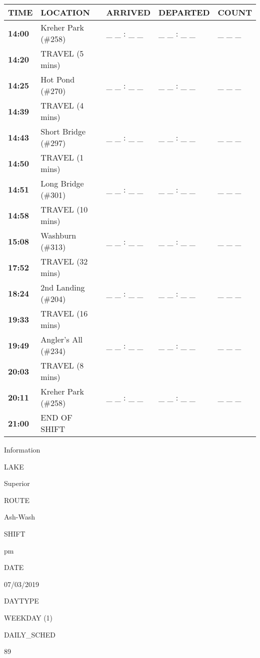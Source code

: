 \documentclass[]{article}
\begin{document}
\begin{tabular}{>{\bfseries}lllll}
\toprule
\textbf{TIME} & \textbf{LOCATION} & \textbf{ARRIVED} & \textbf{DEPARTED} & \textbf{COUNT}\\
\midrule
14:00 & Kreher Park (\#258) & \_ \_ : \_ \_ & \_ \_ : \_ \_ & \_ \_ \_\\
14:20 & TRAVEL (5 mins) &  &  & \\
14:25 & Hot Pond (\#270) & \_ \_ : \_ \_ & \_ \_ : \_ \_ & \_ \_ \_\\
14:39 & TRAVEL (4 mins) &  &  & \\
14:43 & Short Bridge (\#297) & \_ \_ : \_ \_ & \_ \_ : \_ \_ & \_ \_ \_\\
14:50 & TRAVEL (1 mins) &  &  & \\
14:51 & Long Bridge (\#301) & \_ \_ : \_ \_ & \_ \_ : \_ \_ & \_ \_ \_\\
14:58 & TRAVEL (10 mins) &  &  & \\
15:08 & Washburn (\#313) & \_ \_ : \_ \_ & \_ \_ : \_ \_ & \_ \_ \_\\
17:52 & TRAVEL (32 mins) &  &  & \\
18:24 & 2nd Landing (\#204) & \_ \_ : \_ \_ & \_ \_ : \_ \_ & \_ \_ \_\\
19:33 & TRAVEL (16 mins) &  &  & \\
19:49 & Angler's All (\#234) & \_ \_ : \_ \_ & \_ \_ : \_ \_ & \_ \_ \_\\
20:03 & TRAVEL (8 mins) &  &  & \\
20:11 & Kreher Park (\#258) & \_ \_ : \_ \_ & \_ \_ : \_ \_ & \_ \_ \_\\
21:00 & END OF SHIFT &  &  & \\
\bottomrule
\end{tabular}\newpage

Information

LAKE

Superior

ROUTE

Ash-Wash

SHIFT

pm

DATE

07/03/2019

DAYTYPE

WEEKDAY (1)

DAILY\_SCHED

89

\vspace{24pt}
\end{document}
